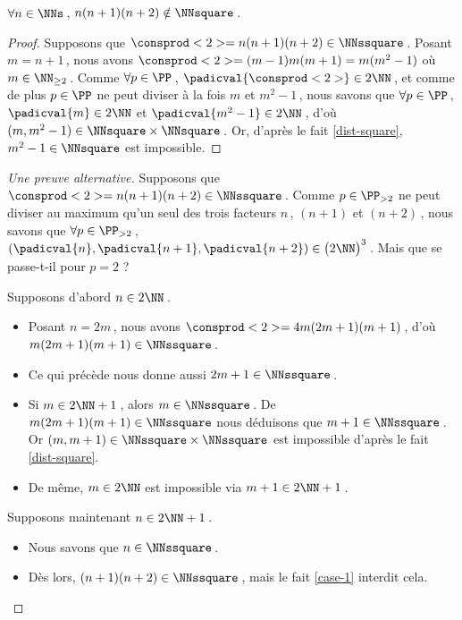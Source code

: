 \begin{fact} \label{case-2}
	 $\forall n \in \NNs$\,, $n(n+1)(n+2) \notin \NNsquare$\,.
\end{fact}




\begin{proof}
    Supposons que $\consprod<2> = n(n+1)(n+2) \in \NNssquare$\,.
    Posant $m = n+1$\,, nous avons $\consprod<2> = (m-1)m(m+1) = m(m^2 - 1)$ où $m \in \NN_{\geq 2}$\,.
    Comme $\forall p \in \PP$\,, $\padicval{\consprod<2>} \in 2 \NN$\,, et comme de plus $p \in \PP$ ne peut diviser à la fois $m$ et $m^2 - 1$\,, nous savons que 
    $\forall p \in \PP$\,, 
    $\padicval{m} \in 2 \NN$ et $\padicval{m^2 - 1} \in 2 \NN$\,,
    d'où 
    $(m, m^2 - 1) \in \NNsquare \times \NNsquare$\,.
    Or, d'après le fait \ref{dist-square}, $m^2 - 1 \in \NNsquare$ est impossible.
\end{proof}




\begin{proof}[Une preuve alternative]
    Supposons que $\consprod<2> = n(n+1)(n+2) \in \NNssquare$\,.
    Comme $p \in \PP_{>2}$ ne peut diviser au maximum qu'un seul des trois facteurs $n$\,, $(n+1)$ et $(n+2)$\,, nous savons que 
    $\forall p \in \PP_{>2}$\,, 
    $(\padicval{n} , \padicval{n + 1} , \padicval{n + 2}) \in \big( 2 \NN \big)^3$\,.
    Mais que se passe-t-il pour $p = 2$ ?
    
    \medskip
    
    Supposons d'abord $n \in 2 \NN$\,.
	\begin{itemize}
		\item Posant $n = 2 m$\,, nous avons $\consprod<2> = 4 m(2m+1)(m+1)$\,, d'où $m(2m+1)(m+1) \in \NNssquare$\,.
		
		\item Ce qui précède nous donne aussi $2m+1 \in \NNssquare$\,.
		
		\item Si $m \in 2 \NN + 1$\,, alors $m \in \NNssquare$\,.
		De $m(2m+1)(m+1) \in \NNssquare$ nous déduisons que $m+1 \in \NNssquare$\,.
		Or $(m , m+1) \in \NNssquare \times \NNssquare$ est impossible d'après le fait \ref{dist-square}.
		
		\item De même, $m \in 2 \NN$ est impossible via $m + 1 \in 2 \NN + 1$\,.
	\end{itemize}
    
    \medskip
    
    Supposons maintenant $n \in 2 \NN + 1$\,.
	\begin{itemize}
		\item Nous savons que $n \in \NNssquare$\,.

		\item Dès lors, $(n+1)(n+2) \in \NNssquare$\,, mais le fait \ref{case-1} interdit cela.
	\end{itemize}
\end{proof}